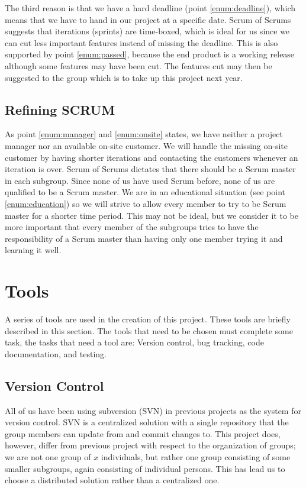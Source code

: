 The third reason is that we have a hard deadline (point \ref{enum:deadline}), which means that we have to hand in our project at a specific date.
Scrum of Scrums suggests that iterations (sprints) are time-boxed, which is ideal for us since we can cut less important features instead of missing the deadline.
This is also supported by point \ref{enum:passed}, because the end product is a working release although some features may have been cut.
The features cut may then be suggested to the group which is to take up this project next year.


\subsection{Refining SCRUM} 
As point \ref{enum:manager} and \ref{enum:onsite} states, we have neither a project manager nor an available on-site customer.
We will handle the missing on-site customer by having shorter iterations and contacting the customers whenever an iteration is over.
Scrum of Scrums\cite{scrumOfScrums} dictates that there should be a Scrum master in each subgroup.
Since none of us have used Scrum before, none of us are qualified to be a Scrum master.
We are in an educational situation (see point \ref{enum:education}) so we will strive to allow every member to try to be Scrum master for a shorter time period.
This may not be ideal, but we consider it to be more important that every member of the subgroups tries to have the responsibility of a Scrum master than having only one member trying it and learning it well.

\begin{comment}
There is more:
*Scrum board
*The phases / meetings
**estimation
**sprint planning
*Scrum meetings
*Scrum of scrum def
*project manager problem
\end{comment}


\section{Tools}\label{subsec:tools}
A series of tools are used in the creation of this project.
These tools are briefly described in this section.
The tools that need to be chosen must complete some task, the tasks that need a tool are: Version control, bug tracking, code documentation, and testing.

\subsection{Version Control}
All of us have been using subversion (SVN) in previous projects as the system for version control.
SVN is a centralized solution \cite{subversion} with a single repository that the group members can update from and commit changes to.
This project does, however, differ from previous project with respect to the organization of groups; we are not one group of $x$ individuals, but rather one group consisting of some smaller subgroups, again consisting of individual persons.
This has lead us to choose a distributed solution rather than a centralized one.

